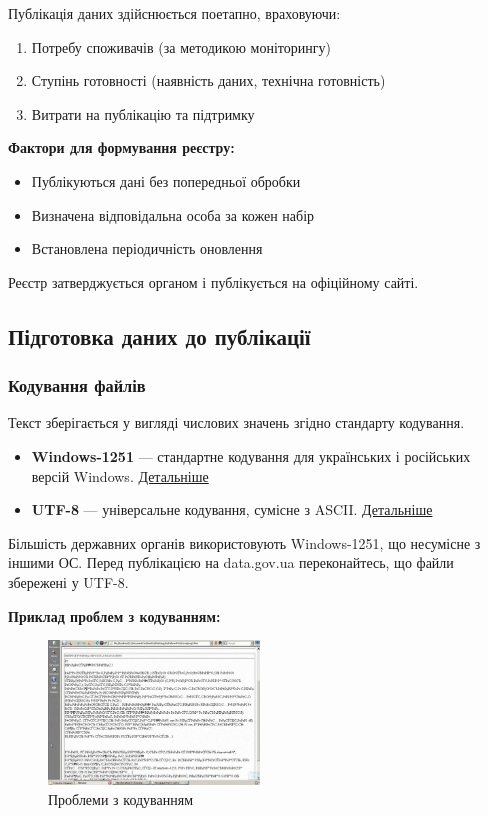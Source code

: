 Публікація даних здійснюється поетапно, враховуючи:

\begin{enumerate}
    \item Потребу споживачів (за методикою моніторингу)
    \item Ступінь готовності (наявність даних, технічна готовність)
    \item Витрати на публікацію та підтримку
\end{enumerate}

\textbf{Фактори для формування реєстру:}

\begin{itemize}
    \item Публікуються дані без попередньої обробки
    \item Визначена відповідальна особа за кожен набір
    \item Встановлена періодичність оновлення
\end{itemize}

Реєстр затверджується органом і публікується на офіційному сайті.

\subsection{Підготовка даних до публікації}

\subsubsection{Кодування файлів}

Текст зберігається у вигляді числових значень згідно стандарту кодування.

\begin{itemize}
    \item \textbf{Windows-1251} — стандартне кодування для українських і російських версій Windows.  
        \href{https://uk.wikipedia.org/wiki/Windows-1251}{Детальніше}
    \item \textbf{UTF-8} — універсальне кодування, сумісне з ASCII.  
        \href{https://uk.wikipedia.org/wiki/UTF-8}{Детальніше}
\end{itemize}

Більшість державних органів використовують Windows-1251, що несумісне з іншими ОС. Перед публікацією на data.gov.ua переконайтесь, що файли збережені у UTF-8.

\textbf{Приклад проблем з кодуванням:}

\begin{figure}[h]
    \centering
    \includegraphics[width=0.5\textwidth]{images/008.gif}
    \caption{Проблеми з кодуванням}
\end{figure}

